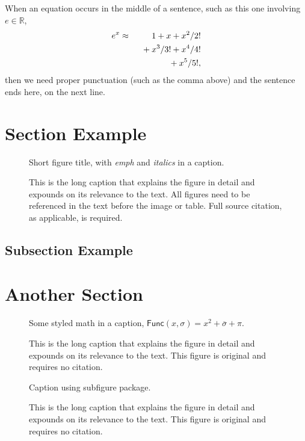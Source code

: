 \lipsum*[65]

When an equation occurs in the middle of a sentence, such as this one involving $e \in \mathbb{R}$,
\begin{eqnarray}
 e^x &\approx& 1+x+x^2/2! \nonumber \\
   && \hphantom{1} + x^3/3! + x^4/4! \nonumber \\
   && \hphantom{1} + x^5/5!,
\end{eqnarray}
then we need proper punctuation (such as the comma above) and the sentence ends here, on the next line.

\section{Section Example}
\lipsum[47]

\begin{figure}[!htb]
\framebox[\textwidth]{\parbox{\textwidth}{\lipsum[65]}}
\caption{Short figure title, with \emph{emph} and \textit{italics} in a caption.}
\caption*{\small This is the long caption that explains the figure in detail and
expounds on its relevance to the text.
All figures need to be referenced in the text before the image or table.
Full source citation, as applicable, is required.
}
\end{figure}

\subsection{Subsection Example}
\lipsum[56]

\section{Another Section}
\lipsum[55-56]

\begin{figure}[!htb]
\framebox[\textwidth]{\parbox{\textwidth}{\lipsum[65]}}
\caption{Some styled math in a caption, $\mathsf{Func}(x, \sigma) = x^2 + \overline{\sigma} + \pi$.}
\caption*{\small This is the long caption that explains the figure in detail
and expounds on its relevance to the text.
This figure is original and requires no citation.}
\end{figure}

\begin{figure}[!htb]
\centering
{}
\hfill
{}
\caption{Caption using subfigure package.}
\caption*{\small This is the long caption that explains the figure in detail
and expounds on its relevance to the text.
This figure is original and requires no citation.}
\end{figure}



